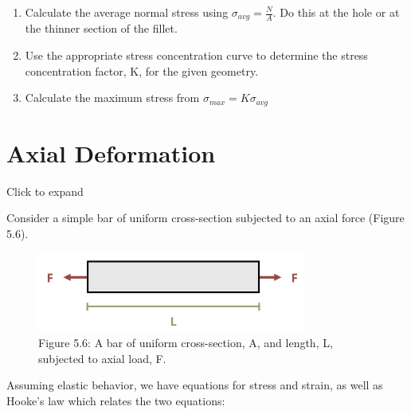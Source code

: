 \documentclass[
  letterpaper,
  DIV=11,
  numbers=noendperiod]{scrreprt}
\theoremstyle{definition}
\theoremstyle{remark}
\begin{document}
\begin{tcolorbox}[enhanced jigsaw, leftrule=.75mm, colbacktitle=quarto-callout-warning-color!10!white, breakable, opacityback=0, colback=white, titlerule=0mm, toprule=.15mm, colframe=quarto-callout-warning-color-frame, coltitle=black, title={Step-by-step: Stress concentrations}, toptitle=1mm, bottomrule=.15mm, rightrule=.15mm, left=2mm, arc=.35mm, opacitybacktitle=0.6, bottomtitle=1mm]

\begin{enumerate}
\def\labelenumi{\arabic{enumi}.}
\item
  Calculate the average normal stress using
  \(\sigma_{avg}=\frac{N}{A}\). Do this at the hole or at the thinner
  section of the fillet.
\item
  Use the appropriate stress concentration curve to determine the stress
  concentration factor, K, for the given geometry.
\item
  Calculate the maximum stress from \(\sigma_{max}=K \sigma_{avg}\)
\end{enumerate}

\end{tcolorbox}

\section{Axial Deformation}\label{sec-5.3}

Click to expand

Consider a simple bar of uniform cross-section subjected to an axial
force (Figure 5.6).

\begin{figure}[H]

{\centering \includegraphics[width=3.48958in,height=\textheight]{images/PNGs/Figure 5.6.png}

}

\caption{Figure 5.6: A bar of uniform cross-section, A, and length, L,
subjected to axial load, F.}

\end{figure}%

Assuming elastic behavior, we have equations for stress and strain, as
well as Hooke's law which relates the two equations:
\end{document}
